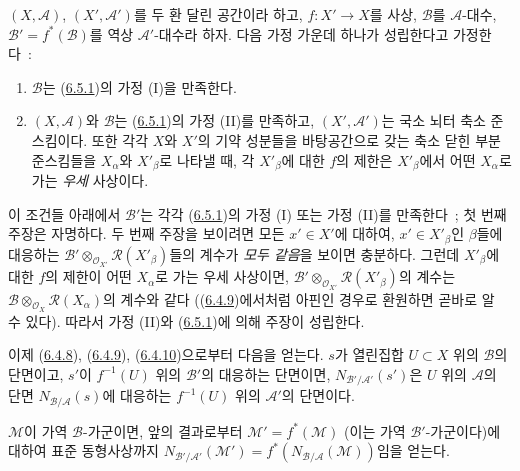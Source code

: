 \begin{env}[6.5.4]
\label{II.6.5.4-ko}
$(X,\mathcal{A})$, $(X',\mathcal{A}')$를 두 환 달린 공간이라 하고,
$f:X'\to X$를 사상, $\mathcal{B}$를 $\mathcal{A}$-대수,
$\mathcal{B}'=f^*(\mathcal{B})$를 역상 $\mathcal{A}'$-대수라 하자. 다음
가정 가운데 하나가 성립한다고 가정한다~:
\begin{enumerate}
\item[$1^\circ$] $\mathcal{B}$는
(\hyperref[II.6.5.1-ko]{6.5.1})의 가정 (I)을 만족한다.
\item[$2^\circ$] $(X,\mathcal{A})$와 $\mathcal{B}$는
(\hyperref[II.6.5.1-ko]{6.5.1})의 가정 (II)를 만족하고,
$(X',\mathcal{A}')$는 국소 뇌터 축소 준스킴이다. 또한 각각 $X$와
$X'$의 기약 성분들을 바탕공간으로 갖는 축소 닫힌 부분준스킴들을
$X_\alpha$와 $X'_\beta$로 나타낼 때, 각 $X'_\beta$에 대한 $f$의
제한은 $X'_\beta$에서 어떤 $X_\alpha$로 가는 \emph{우세} 사상이다.
\end{enumerate}
이 조건들 아래에서 $\mathcal{B}'$는 각각
(\hyperref[II.6.5.1-ko]{6.5.1})의 가정 (I) 또는 가정 (II)를 만족한다~;
첫 번째 주장은 자명하다. 두 번째 주장을 보이려면 모든 $x'\in X'$에
대하여, $x'\in X'_\beta$인 $\beta$들에 대응하는
$\mathcal{B}'\otimes_{\mathcal{O}_{X'}}\mathcal{R}(X'_\beta)$들의
계수가 \emph{모두 같음}을 보이면 충분하다. 그런데 $X'_\beta$에 대한
$f$의 제한이 어떤 $X_\alpha$로 가는 우세 사상이면,
$\mathcal{B}'\otimes_{\mathcal{O}_{X'}}\mathcal{R}(X'_\beta)$의 계수는
$\mathcal{B}\otimes_{\mathcal{O}_X}\mathcal{R}(X_\alpha)$의 계수와 같다
((\hyperref[II.6.4.9-ko]{6.4.9})에서처럼 아핀인 경우로 환원하면 곧바로
알 수 있다). 따라서 가정 (II)와
(\hyperref[II.6.5.1-ko]{6.5.1})에 의해 주장이 성립한다.


이제 (\hyperref[II.6.4.8-ko]{6.4.8}),
(\hyperref[II.6.4.9-ko]{6.4.9}),
(\hyperref[II.6.4.10-ko]{6.4.10})으로부터 다음을 얻는다. $s$가 열린집합
$U\subset X$ 위의 $\mathcal{B}$의 단면이고, $s'$이 $f^{-1}(U)$ 위의
$\mathcal{B}'$의 대응하는 단면이면,
$N_{\mathcal{B}'/\mathcal{A}'}(s')$은 $U$ 위의 $\mathcal{A}$의 단면
$N_{\mathcal{B}/\mathcal{A}}(s)$에 대응하는 $f^{-1}(U)$ 위의
$\mathcal{A}'$의 단면이다.

$\mathcal{M}$이 가역 $\mathcal{B}$-가군이면, 앞의 결과로부터
$\mathcal{M}'=f^*(\mathcal{M})$ (이는 가역 $\mathcal{B}'$-가군이다)에
대하여 표준 동형사상까지
$N_{\mathcal{B}'/\mathcal{A}'}(\mathcal{M}')
=f^*(N_{\mathcal{B}/\mathcal{A}}(\mathcal{M}))$임을 얻는다.
\end{env}

